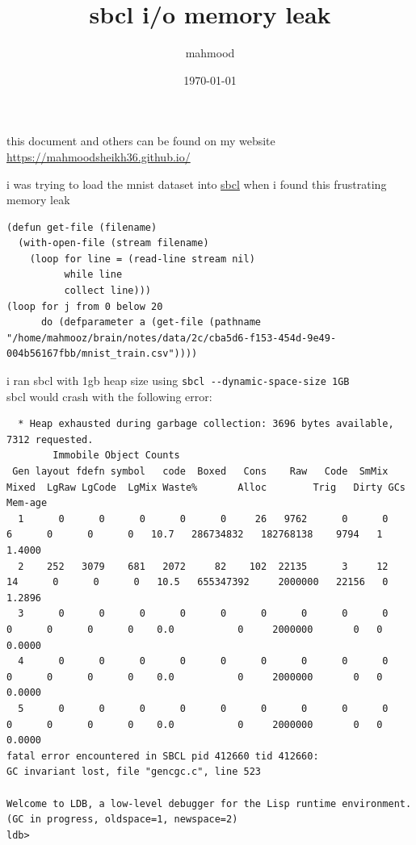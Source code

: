 \documentclass[a4paper,12pt]{article}
\author{mahmood}
\date{\today}
\title{sbcl i/o memory leak}
\begin{document}
\maketitle
\begin{note}
this document and others can be found on my website\\
\url{https://mahmoodsheikh36.github.io/}
\end{note}
i was trying to load the mnist dataset into \href{20230429181052-sbcl.org}{sbcl} when i found this frustrating memory leak\\
\lstset{language=Lisp,label= ,caption= ,captionpos=b,numbers=none}
\begin{lstlisting}
(defun get-file (filename)
  (with-open-file (stream filename)
    (loop for line = (read-line stream nil)
          while line
          collect line)))
(loop for j from 0 below 20
      do (defparameter a (get-file (pathname "/home/mahmooz/brain/notes/data/2c/cba5d6-f153-454d-9e49-004b56167fbb/mnist_train.csv"))))
\end{lstlisting}
i ran sbcl with 1gb heap size using \texttt{sbcl -{}-dynamic-space-size 1GB}\\
sbcl would crash with the following error:\\
\lstset{language=Lisp,label= ,caption= ,captionpos=b,numbers=none}
\begin{lstlisting}
  * Heap exhausted during garbage collection: 3696 bytes available, 7312 requested.
        Immobile Object Counts
 Gen layout fdefn symbol   code  Boxed   Cons    Raw   Code  SmMix  Mixed  LgRaw LgCode  LgMix Waste%       Alloc        Trig   Dirty GCs Mem-age
  1      0      0      0      0      0     26   9762      0      0      6      0      0      0   10.7   286734832   182768138    9794   1  1.4000
  2    252   3079    681   2072     82    102  22135      3     12     14      0      0      0   10.5   655347392     2000000   22156   0  1.2896
  3      0      0      0      0      0      0      0      0      0      0      0      0      0    0.0           0     2000000       0   0  0.0000
  4      0      0      0      0      0      0      0      0      0      0      0      0      0    0.0           0     2000000       0   0  0.0000
  5      0      0      0      0      0      0      0      0      0      0      0      0      0    0.0           0     2000000       0   0  0.0000
fatal error encountered in SBCL pid 412660 tid 412660:
GC invariant lost, file "gencgc.c", line 523

Welcome to LDB, a low-level debugger for the Lisp runtime environment.
(GC in progress, oldspace=1, newspace=2)
ldb>
\end{lstlisting}
\end{document}
